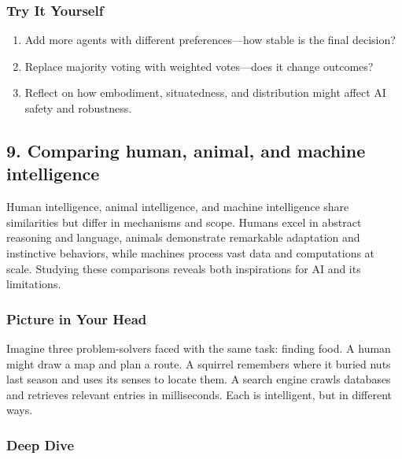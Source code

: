 \documentclass[
  letterpaper,
  DIV=11,
  numbers=noendperiod]{scrreprt}
\providecommand{\tightlist}{%
  \setlength{\itemsep}{0pt}\setlength{\parskip}{0pt}}
\begin{document}
\subsubsection{Try It Yourself}\label{try-it-yourself-7}

\begin{enumerate}
\def\labelenumi{\arabic{enumi}.}
\tightlist
\item
  Add more agents with different preferences---how stable is the final
  decision?
\item
  Replace majority voting with weighted votes---does it change outcomes?
\item
  Reflect on how embodiment, situatedness, and distribution might affect
  AI safety and robustness.
\end{enumerate}

\subsection{9. Comparing human, animal, and machine
intelligence}\label{comparing-human-animal-and-machine-intelligence}

Human intelligence, animal intelligence, and machine intelligence share
similarities but differ in mechanisms and scope. Humans excel in
abstract reasoning and language, animals demonstrate remarkable
adaptation and instinctive behaviors, while machines process vast data
and computations at scale. Studying these comparisons reveals both
inspirations for AI and its limitations.

\subsubsection{Picture in Your Head}\label{picture-in-your-head-8}

Imagine three problem-solvers faced with the same task: finding food. A
human might draw a map and plan a route. A squirrel remembers where it
buried nuts last season and uses its senses to locate them. A search
engine crawls databases and retrieves relevant entries in milliseconds.
Each is intelligent, but in different ways.

\subsubsection{Deep Dive}\label{deep-dive-8}
\end{document}
